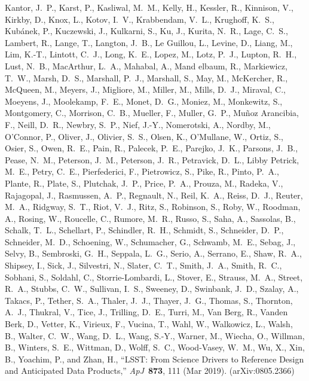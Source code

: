\documentclass[]{spie}
\newcommand{\apj}{ApJ}
\begin{document}
\begin{thebibliography}{10}
    {Kantor}, J.~P., {Karst}, P., {Kasliwal}, M.~M., {Kelly}, H., {Kessler}, R.,
    {Kinnison}, V., {Kirkby}, D., {Knox}, L., {Kotov}, I.~V., {Krabbendam},
    V.~L., {Krughoff}, K.~S., {Kub{\'a}nek}, P., {Kuczewski}, J., {Kulkarni}, S.,
    {Ku}, J., {Kurita}, N.~R., {Lage}, C.~S., {Lambert}, R., {Lange}, T.,
    {Langton}, J.~B., {Le Guillou}, L., {Levine}, D., {Liang}, M., {Lim}, K.-T.,
    {Lintott}, C.~J., {Long}, K.~E., {Lopez}, M., {Lotz}, P.~J., {Lupton}, R.~H.,
    {Lust}, N.~B., {MacArthur}, L.~A., {Mahabal}, A., {Mand elbaum}, R.,
    {Markiewicz}, T.~W., {Marsh}, D.~S., {Marshall}, P.~J., {Marshall}, S.,
    {May}, M., {McKercher}, R., {McQueen}, M., {Meyers}, J., {Migliore}, M.,
    {Miller}, M., {Mills}, D.~J., {Miraval}, C., {Moeyens}, J., {Moolekamp},
    F.~E., {Monet}, D.~G., {Moniez}, M., {Monkewitz}, S., {Montgomery}, C.,
    {Morrison}, C.~B., {Mueller}, F., {Muller}, G.~P., {Mu{\~n}oz Arancibia}, F.,
    {Neill}, D.~R., {Newbry}, S.~P., {Nief}, J.-Y., {Nomerotski}, A., {Nordby},
    M., {O'Connor}, P., {Oliver}, J., {Olivier}, S.~S., {Olsen}, K., {O'Mullane},
    W., {Ortiz}, S., {Osier}, S., {Owen}, R.~E., {Pain}, R., {Palecek}, P.~E.,
    {Parejko}, J.~K., {Parsons}, J.~B., {Pease}, N.~M., {Peterson}, J.~M.,
    {Peterson}, J.~R., {Petravick}, D.~L., {Libby Petrick}, M.~E., {Petry},
    C.~E., {Pierfederici}, F., {Pietrowicz}, S., {Pike}, R., {Pinto}, P.~A.,
    {Plante}, R., {Plate}, S., {Plutchak}, J.~P., {Price}, P.~A., {Prouza}, M.,
    {Radeka}, V., {Rajagopal}, J., {Rasmussen}, A.~P., {Regnault}, N., {Reil},
    K.~A., {Reiss}, D.~J., {Reuter}, M.~A., {Ridgway}, S.~T., {Riot}, V.~J.,
    {Ritz}, S., {Robinson}, S., {Roby}, W., {Roodman}, A., {Rosing}, W.,
    {Roucelle}, C., {Rumore}, M.~R., {Russo}, S., {Saha}, A., {Sassolas}, B.,
    {Schalk}, T.~L., {Schellart}, P., {Schindler}, R.~H., {Schmidt}, S.,
    {Schneider}, D.~P., {Schneider}, M.~D., {Schoening}, W., {Schumacher}, G.,
    {Schwamb}, M.~E., {Sebag}, J., {Selvy}, B., {Sembroski}, G.~H., {Seppala},
    L.~G., {Serio}, A., {Serrano}, E., {Shaw}, R.~A., {Shipsey}, I., {Sick}, J.,
    {Silvestri}, N., {Slater}, C.~T., {Smith}, J.~A., {Smith}, R.~C., {Sobhani},
    S., {Soldahl}, C., {Storrie-Lombardi}, L., {Stover}, E., {Strauss}, M.~A.,
    {Street}, R.~A., {Stubbs}, C.~W., {Sullivan}, I.~S., {Sweeney}, D.,
    {Swinbank}, J.~D., {Szalay}, A., {Takacs}, P., {Tether}, S.~A., {Thaler},
    J.~J., {Thayer}, J.~G., {Thomas}, S., {Thornton}, A.~J., {Thukral}, V.,
    {Tice}, J., {Trilling}, D.~E., {Turri}, M., {Van Berg}, R., {Vanden Berk},
    D., {Vetter}, K., {Virieux}, F., {Vucina}, T., {Wahl}, W., {Walkowicz}, L.,
    {Walsh}, B., {Walter}, C.~W., {Wang}, D.~L., {Wang}, S.-Y., {Warner}, M.,
    {Wiecha}, O., {Willman}, B., {Winters}, S.~E., {Wittman}, D., {Wolff}, S.~C.,
    {Wood-Vasey}, W.~M., {Wu}, X., {Xin}, B., {Yoachim}, P., and {Zhan}, H.,
    ``{LSST: From Science Drivers to Reference Design and Anticipated Data
    Products},'' {\em \apj}~{\bf 873},  111 (Mar 2019).
    (arXiv:0805.2366)


\end{thebibliography}
\end{document}
